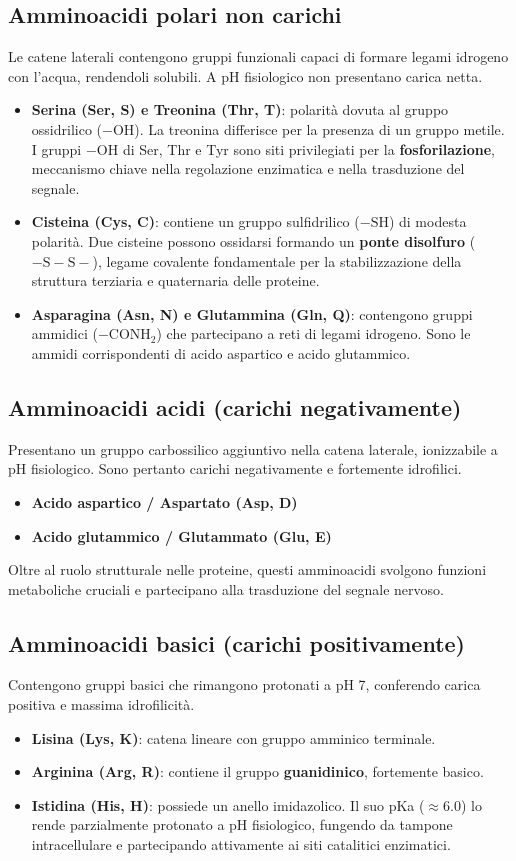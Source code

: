 \documentclass[12pt,a4paper]{report}
\begin{document}
\subsection{Amminoacidi polari non carichi}
Le catene laterali contengono gruppi funzionali capaci di formare legami idrogeno con l'acqua, rendendoli solubili. A pH fisiologico non presentano carica netta.
\begin{itemize}
\item \textbf{Serina (Ser, S) e Treonina (Thr, T)}: polarità dovuta al gruppo ossidrilico (\(-\mathrm{OH}\)). La treonina differisce per la presenza di un gruppo metile. I gruppi \(-\mathrm{OH}\) di Ser, Thr e Tyr sono siti privilegiati per la \textbf{fosforilazione}, meccanismo chiave nella regolazione enzimatica e nella trasduzione del segnale.
\item \textbf{Cisteina (Cys, C)}: contiene un gruppo sulfidrilico (\(-\mathrm{SH}\)) di modesta polarità. Due cisteine possono ossidarsi formando un \textbf{ponte disolfuro} (\(-\mathrm{S-S-}\)), legame covalente fondamentale per la stabilizzazione della struttura terziaria e quaternaria delle proteine.
\item \textbf{Asparagina (Asn, N) e Glutammina (Gln, Q)}: contengono gruppi ammidici (\(-\mathrm{CONH_2}\)) che partecipano a reti di legami idrogeno. Sono le ammidi corrispondenti di acido aspartico e acido glutammico.
\end{itemize}

\subsection{Amminoacidi acidi (carichi negativamente)}
Presentano un gruppo carbossilico aggiuntivo nella catena laterale, ionizzabile a pH fisiologico. Sono pertanto carichi negativamente e fortemente idrofilici.
\begin{itemize}
\item \textbf{Acido aspartico / Aspartato (Asp, D)}
\item \textbf{Acido glutammico / Glutammato (Glu, E)}
\end{itemize}
Oltre al ruolo strutturale nelle proteine, questi amminoacidi svolgono funzioni metaboliche cruciali e partecipano alla trasduzione del segnale nervoso.

\subsection{Amminoacidi basici (carichi positivamente)}
Contengono gruppi basici che rimangono protonati a pH 7, conferendo carica positiva e massima idrofilicità.
\begin{itemize}
\item \textbf{Lisina (Lys, K)}: catena lineare con gruppo amminico terminale.
\item \textbf{Arginina (Arg, R)}: contiene il gruppo \textbf{guanidinico}, fortemente basico.
\item \textbf{Istidina (His, H)}: possiede un anello imidazolico. Il suo pKa (\(\approx 6.0\)) lo rende parzialmente protonato a pH fisiologico, fungendo da tampone intracellulare e partecipando attivamente ai siti catalitici enzimatici.
\end{itemize}
\end{document}
